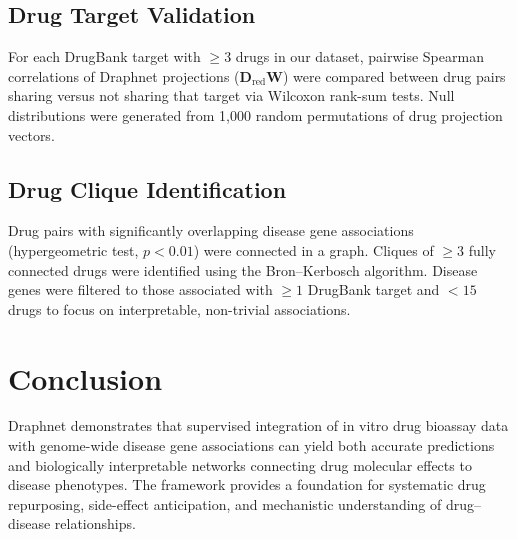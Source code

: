\documentclass[11pt]{article}
\begin{document}
\subsection{Drug Target Validation}

For each DrugBank target with $\geq 3$ drugs in our dataset, pairwise Spearman correlations of Draphnet projections ($\mathbf{D}_{\mathrm{red}} \mathbf{W}$) were compared between drug pairs sharing versus not sharing that target via Wilcoxon rank-sum tests. Null distributions were generated from 1,000 random permutations of drug projection vectors.

\subsection{Drug Clique Identification}

Drug pairs with significantly overlapping disease gene associations (hypergeometric test, $p < 0.01$) were connected in a graph. Cliques of $\geq 3$ fully connected drugs were identified using the Bron--Kerbosch algorithm. Disease genes were filtered to those associated with $\geq 1$ DrugBank target and $< 15$ drugs to focus on interpretable, non-trivial associations.

\section{Conclusion}

Draphnet demonstrates that supervised integration of in vitro drug bioassay data with genome-wide disease gene associations can yield both accurate predictions and biologically interpretable networks connecting drug molecular effects to disease phenotypes. The framework provides a foundation for systematic drug repurposing, side-effect anticipation, and mechanistic understanding of drug--disease relationships.



\end{document}
